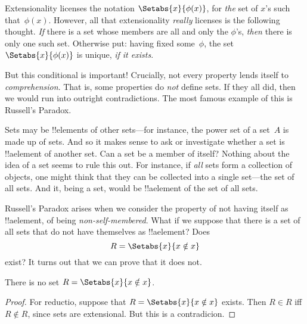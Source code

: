 \documentclass[../../../include/open-logic-section]{subfiles}
\begin{document}

Extensionality licenses the notation $\Setabs{x}{\phi(x)}$, for
\emph{the} set of $x$'s such that~$\phi(x)$. However, all that
extensionality \emph{really} licenses is the following thought.
\emph{If} there is a set whose members are all and only the $\phi$'s,
\emph{then} there is only one such set. Otherwise put: having fixed
some~$\phi$, the set $\Setabs{x}{\phi(x)}$ is unique, \emph{if it
exists}.

But this conditional is important!{} Crucially, not every property
lends itself to \emph{comprehension}. That is, some  properties do
\emph{not} define sets. If they all did, then we would run into
outright contradictions. The most famous example of this is Russell's
Paradox.

Sets may be !!{element}s of other sets---for instance, the power set
of a set~$A$ is made up of sets. And so it makes sense to ask or
investigate whether a set is !!a{element} of another set. Can a set be
a member of itself?  Nothing about the idea of a set seems to rule
this out. For instance, if \emph{all} sets form a collection of
objects, one might think that they can be collected into a single
set---the set of all sets. And it, being a set, would be !!a{element}
of the set of all sets. 

Russell's Paradox arises when we consider the property of not having
itself as !!a{element}, of being \emph{non-self-membered}. What if we
suppose that there is a set of all sets that do not have themselves as
!!a{element}? Does
\[
R = \Setabs{x}{x \notin x}
\]
exist? It turns out that we can prove that it does not.

\begin{thm}
	There is no set $R = \Setabs{x}{x \notin x}$.
\end{thm}

\begin{proof}
For reductio, suppose that $R = \Setabs{x}{x \notin x}$ exists. Then
$R \in R$ iff $R \notin R$, since sets are extensional.
But this is a contradicion.
\end{proof}
\end{document}
